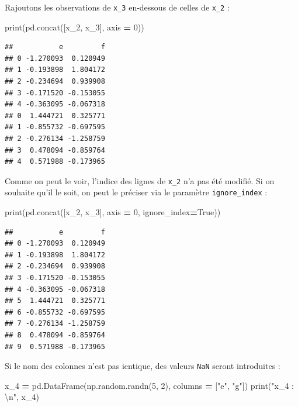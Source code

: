 \documentclass[12pt,]{book}
\newenvironment{Shaded}{\begin{snugshade}}{\end{snugshade}}
\newcommand{\DecValTok}[1]{\textcolor[rgb]{0.00,0.00,0.81}{#1}}
\newcommand{\CharTok}[1]{\textcolor[rgb]{0.31,0.60,0.02}{#1}}
\newcommand{\StringTok}[1]{\textcolor[rgb]{0.31,0.60,0.02}{#1}}
\newcommand{\VariableTok}[1]{\textcolor[rgb]{0.00,0.00,0.00}{#1}}
\newcommand{\OperatorTok}[1]{\textcolor[rgb]{0.81,0.36,0.00}{\textbf{#1}}}
\newcommand{\BuiltInTok}[1]{#1}
\newcommand{\NormalTok}[1]{#1}
\numberwithin{equation}{section}
\numberwithin{countremarque}{section}
\begin{document}
Rajoutons les observations de \texttt{x\_3} en-dessous de celles de
\texttt{x\_2} :

\begin{Shaded}
\begin{Highlighting}[]
\BuiltInTok{print}\NormalTok{(pd.concat([x_2, x_3], axis }\OperatorTok{=} \DecValTok{0}\NormalTok{))}
\end{Highlighting}
\end{Shaded}

\begin{lstlisting}
##           e         f
## 0 -1.270093  0.120949
## 1 -0.193898  1.804172
## 2 -0.234694  0.939908
## 3 -0.171520 -0.153055
## 4 -0.363095 -0.067318
## 0  1.444721  0.325771
## 1 -0.855732 -0.697595
## 2 -0.276134 -1.258759
## 3  0.478094 -0.859764
## 4  0.571988 -0.173965
\end{lstlisting}

Comme on peut le voir, l'indice des lignes de \texttt{x\_2} n'a pas été
modifié. Si on souhaite qu'il le soit, on peut le préciser via le
paramètre \texttt{ignore\_index} :

\begin{Shaded}
\begin{Highlighting}[]
\BuiltInTok{print}\NormalTok{(pd.concat([x_2, x_3], axis }\OperatorTok{=} \DecValTok{0}\NormalTok{, ignore_index}\OperatorTok{=}\VariableTok{True}\NormalTok{))}
\end{Highlighting}
\end{Shaded}

\begin{lstlisting}
##           e         f
## 0 -1.270093  0.120949
## 1 -0.193898  1.804172
## 2 -0.234694  0.939908
## 3 -0.171520 -0.153055
## 4 -0.363095 -0.067318
## 5  1.444721  0.325771
## 6 -0.855732 -0.697595
## 7 -0.276134 -1.258759
## 8  0.478094 -0.859764
## 9  0.571988 -0.173965
\end{lstlisting}

Si le nom des colonnes n'est pas ientique, des valeurs \texttt{NaN}
seront introduites :

\begin{Shaded}
\begin{Highlighting}[]
\NormalTok{x_4 }\OperatorTok{=}\NormalTok{ pd.DataFrame(np.random.randn(}\DecValTok{5}\NormalTok{, }\DecValTok{2}\NormalTok{),}
\NormalTok{                   columns }\OperatorTok{=}\NormalTok{ [}\StringTok{"e"}\NormalTok{, }\StringTok{"g"}\NormalTok{])}
\BuiltInTok{print}\NormalTok{(}\StringTok{"x_4 : }\CharTok{\textbackslash{}n}\StringTok{"}\NormalTok{, x_4)}
\end{Highlighting}
\end{Shaded}
\end{document}

